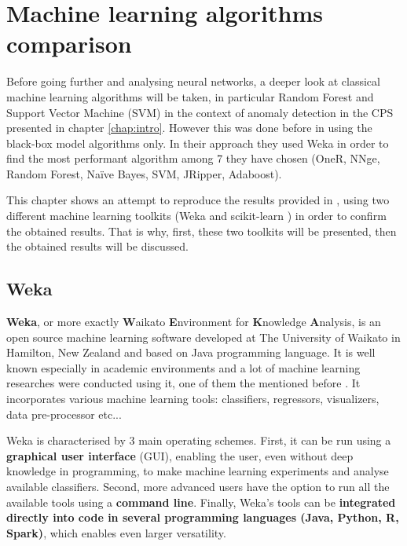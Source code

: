 \chapter{Machine learning algorithms comparison} \label{chap:methods}


Before going further and analysing neural networks, a deeper look at classical machine learning algorithms will be taken, in particular Random Forest and Support Vector Machine (SVM) in the context of anomaly detection in the CPS presented in chapter \ref{chap:intro}. However this was done before in \cite{borges_hink_machine_2014-1} using the black-box model algorithms only. In their approach they used Weka \cite{witten_appendix_2017} in order to find the most performant algorithm among 7 they have chosen (OneR, NNge, Random Forest, Naïve Bayes, SVM, JRipper, Adaboost). 

This chapter shows an attempt to reproduce the results provided in \cite{borges_hink_machine_2014-1}, using two different machine learning toolkits (Weka and scikit-learn \cite{pedregosa_scikit-learn_2011}) in order to confirm the obtained results. That is why, first, these two toolkits will be presented, then the obtained results will be discussed.  

\section{Weka} \label{sec:weka_in_chap:methods}
\textbf{Weka}, or more exactly \textbf{W}aikato \textbf{E}nvironment for \textbf{K}nowledge \textbf{A}nalysis, is an open source machine learning software developed at The University of Waikato in Hamilton, New Zealand and based on Java programming language. It is well known especially in academic environments and a lot of machine learning researches were conducted using it, one of them the mentioned before \cite{borges_hink_machine_2014-1}. It incorporates various machine learning tools: classifiers, regressors, visualizers, data pre-processor etc...

Weka is characterised by 3 main operating schemes. First, it can be run using a \textbf{graphical user interface} (GUI), enabling the user, even without deep knowledge in programming, to make machine learning experiments and analyse available classifiers. Second, more advanced users have the option to run all the available tools using a \textbf{command line}. Finally, Weka's tools can be \textbf{integrated directly into code in several programming languages (Java, Python, R, Spark)}, which enables even larger versatility.

